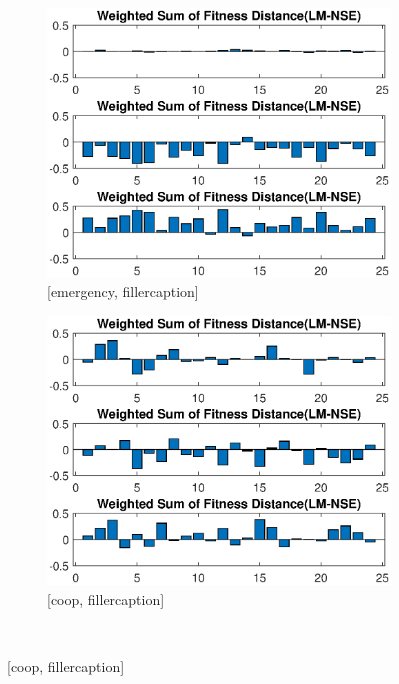 \begin{figure}[ht!]

\begin{subfigure}{0.55\linewidth}
	\centering
	\includegraphics[scale=0.6]{figures/c_sim_results/emer_weighted_sumFitness.eps}
	\caption{[emergency, fillercaption]}
	\label{fig:cSimWeightEmer}
\end{subfigure}%
\begin{subfigure}{0.55\linewidth}
	\centering
	\includegraphics[scale=0.6]{figures/c_sim_results/coop_weighted_sumFitness.eps}
	\caption{[coop, fillercaption]}
	\label{fig:cSimWeightCoop}
\end{subfigure}\\

\end{figure}
